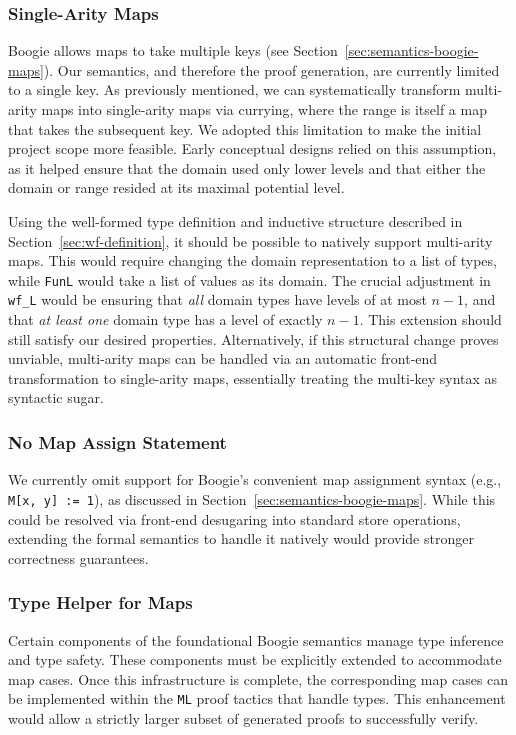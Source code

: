 \documentclass[11pt]{article}
\begin{document}
\subsubsection{Single-Arity Maps}
Boogie allows maps to take multiple keys (see Section~\ref{sec:semantics-boogie-maps}).
Our semantics, and therefore the proof generation, are currently limited to a single key.
As previously mentioned, we can systematically transform multi-arity maps into single-arity maps via currying,
where the range is itself a map that takes the subsequent key.
We adopted this limitation to make the initial project scope more feasible.
Early conceptual designs relied on this assumption,
as it helped ensure that the domain used only lower levels
and that either the domain or range resided at its maximal potential level.

Using the well-formed type definition and inductive structure described in Section~\ref{sec:wf-definition},
it should be possible to natively support multi-arity maps.
This would require changing the domain representation to a list of types,
while \texttt{FunL} would take a list of values as its domain.
The crucial adjustment in \texttt{wf\_L} would be ensuring that \emph{all} domain types have levels of at most $n-1$,
and that \emph{at least one} domain type has a level of exactly $n-1$.
This extension should still satisfy our desired properties.
Alternatively, if this structural change proves unviable,
multi-arity maps can be handled via an automatic front-end transformation to single-arity maps,
essentially treating the multi-key syntax as syntactic sugar.


\subsubsection{No Map Assign Statement}
We currently omit support for Boogie's convenient map assignment syntax (e.g., \texttt{M[x, y] := 1}), as discussed in Section~\ref{sec:semantics-boogie-maps}.
While this could be resolved via front-end desugaring into standard store operations,
extending the formal semantics to handle it natively would provide stronger correctness guarantees.

\subsubsection{Type Helper for Maps}
Certain components of the foundational Boogie semantics manage type inference and type safety.
These components must be explicitly extended to accommodate map cases.
Once this infrastructure is complete, the corresponding map cases can be implemented within the \texttt{ML} proof tactics that handle types.
This enhancement would allow a strictly larger subset of generated proofs to successfully verify.
\end{document}

